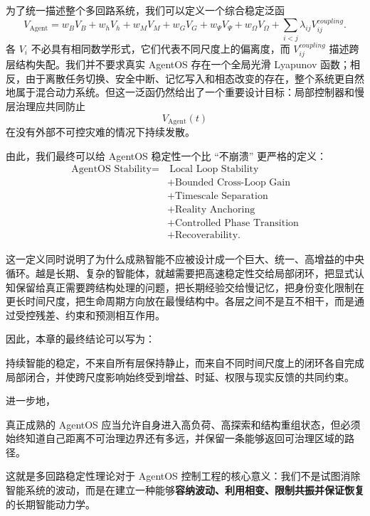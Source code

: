 为了统一描述整个多回路系统，我们可以定义一个综合稳定泛函
\[
V_{\mathrm{Agent}}
=
w_BV_B
+
w_hV_h
+
w_MV_M
+
w_GV_G
+
w_\Psi V_\Psi
+
w_\Omega V_\Omega
+
\sum_{i<j}
\lambda_{ij}V_{ij}^{coupling}.
\]
各 $V_i$ 不必具有相同数学形式，它们代表不同尺度上的偏离度，而 $V_{ij}^{coupling}$ 描述跨层结构失配。我们并不要求真实 AgentOS 存在一个全局光滑 Lyapunov 函数；相反，由于离散任务切换、安全中断、记忆写入和相态改变的存在，整个系统更自然地属于混合动力系统。但这一泛函仍然给出了一个重要设计目标：局部控制器和慢层治理应共同防止
\[
V_{\mathrm{Agent}}(t)
\]
在没有外部不可控灾难的情况下持续发散。

由此，我们最终可以给 AgentOS 稳定性一个比 ``不崩溃'' 更严格的定义：
\[
\boxed{
\begin{aligned}
\text{AgentOS Stability}
=
&\ \text{Local Loop Stability}\\
&+\text{Bounded Cross-Loop Gain}\\
&+\text{Timescale Separation}\\
&+\text{Reality Anchoring}\\
&+\text{Controlled Phase Transition}\\
&+\text{Recoverability}.
\end{aligned}
}
\]

这一定义同时说明了为什么成熟智能不应被设计成一个巨大、统一、高增益的中央循环。越是长期、复杂的智能体，就越需要把高速稳定性交给局部闭环，把显式认知保留给真正需要跨结构处理的问题，把长期经验交给慢记忆，把身份变化限制在更长时间尺度，把生命周期方向放在最慢结构中。各层之间不是互不相干，而是通过受控残差、约束和预测相互作用。

因此，本章的最终结论可以写为：
\begin{conclusion}
持续智能的稳定，不来自所有层保持静止，而来自不同时间尺度上的闭环各自完成局部闭合，并使跨尺度影响始终受到增益、时延、权限与现实反馈的共同约束。
\end{conclusion}

进一步地，
\begin{statementbox}
真正成熟的 AgentOS 应当允许自身进入高负荷、高探索和结构重组状态，但必须始终知道自己距离不可治理边界还有多远，并保留一条能够返回可治理区域的路径。
\end{statementbox}

这就是多回路稳定性理论对于 AgentOS 控制工程的核心意义：我们不是试图消除智能系统的波动，而是在建立一种能够\textbf{容纳波动、利用相变、限制共振并保证恢复}的长期智能动力学。

